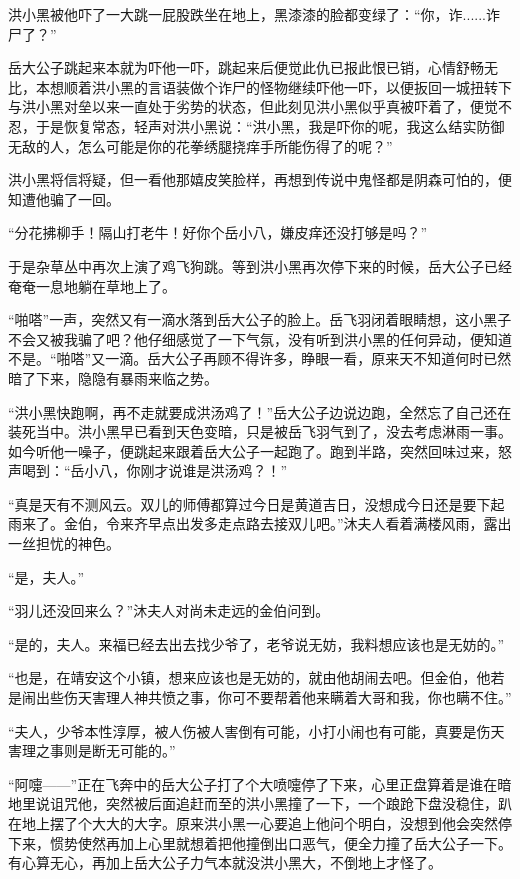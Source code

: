 洪小黑被他吓了一大跳一屁股跌坐在地上，黑漆漆的脸都变绿了：“你，诈......诈尸了？”

岳大公子跳起来本就为吓他一吓，跳起来后便觉此仇已报此恨已销，心情舒畅无比，本想顺着洪小黑的言语装做个诈尸的怪物继续吓他一吓，以便扳回一城扭转下与洪小黑对垒以来一直处于劣势的状态，但此刻见洪小黑似乎真被吓着了，便觉不忍，于是恢复常态，轻声对洪小黑说：“洪小黑，我是吓你的呢，我这么结实防御无敌的人，怎么可能是你的花拳绣腿挠痒手所能伤得了的呢？”

洪小黑将信将疑，但一看他那嬉皮笑脸样，再想到传说中鬼怪都是阴森可怕的，便知遭他骗了一回。

“分花拂柳手！隔山打老牛！好你个岳小八，嫌皮痒还没打够是吗？”

于是杂草丛中再次上演了鸡飞狗跳。等到洪小黑再次停下来的时候，岳大公子已经奄奄一息地躺在草地上了。

“啪嗒”一声，突然又有一滴水落到岳大公子的脸上。岳飞羽闭着眼睛想，这小黑子不会又被我骗了吧？他仔细感觉了一下气氛，没有听到洪小黑的任何异动，便知道不是。“啪嗒”又一滴。岳大公子再顾不得许多，睁眼一看，原来天不知道何时已然暗了下来，隐隐有暴雨来临之势。

“洪小黑快跑啊，再不走就要成洪汤鸡了！”岳大公子边说边跑，全然忘了自己还在装死当中。洪小黑早已看到天色变暗，只是被岳飞羽气到了，没去考虑淋雨一事。如今听他一噪子，便跳起来跟着岳大公子一起跑了。跑到半路，突然回味过来，怒声喝到：“岳小八，你刚才说谁是洪汤鸡？！”


“真是天有不测风云。双儿的师傅都算过今日是黄道吉日，没想成今日还是要下起雨来了。金伯，令来齐早点出发多走点路去接双儿吧。”沐夫人看着满楼风雨，露出一丝担忧的神色。

“是，夫人。”

“羽儿还没回来么？”沐夫人对尚未走远的金伯问到。

“是的，夫人。来福已经去出去找少爷了，老爷说无妨，我料想应该也是无妨的。”

“也是，在靖安这个小镇，想来应该也是无妨的，就由他胡闹去吧。但金伯，他若是闹出些伤天害理人神共愤之事，你可不要帮着他来瞒着大哥和我，你也瞒不住。”

“夫人，少爷本性淳厚，被人伤被人害倒有可能，小打小闹也有可能，真要是伤天害理之事则是断无可能的。”


“阿嚏------”正在飞奔中的岳大公子打了个大喷嚏停了下来，心里正盘算着是谁在暗地里说诅咒他，突然被后面追赶而至的洪小黑撞了一下，一个踉跄下盘没稳住，趴在地上摆了个大大的大字。原来洪小黑一心要追上他问个明白，没想到他会突然停下来，惯势使然再加上心里就想着把他撞倒出口恶气，便全力撞了岳大公子一下。有心算无心，再加上岳大公子力气本就没洪小黑大，不倒地上才怪了。

